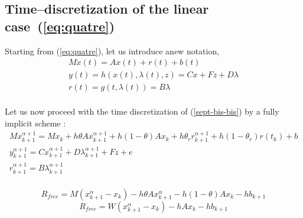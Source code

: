  

\subsection{Time--discretization of the linear case~(\ref{eq:quatre}) } 


Starting from  (\ref{eq:quatre}), let us introduce anew notation, 
\begin{equation}
\begin{array}{l}
M \dot{x}(t) = Ax(t) + r(t)  +b(t)\\[2mm]
y(t) = h(x(t),\lambda (t),z) = Cx + Fz + D \lambda  \\[2mm]
r(t) = g(t,\lambda (t) ) = B \lambda \\[2mm]
\end{array}
\label{sept-bis-bis}
\end{equation}

Let us now proceed with the time discretization of (\ref{sept-bis-bis}) by a fully implicit scheme : 
\begin{equation}
  \begin{array}{l}
    \label{eq:toto1}
     M x^{\alpha+1}_{k+1} = M x_{k} +h\theta A x^{\alpha+1}_{k+1}+h(1-\theta) A x_k + h \theta _r r^{\alpha+1}_{k+1}+ h(1-\theta _r)r(t_k)  +b\\[2mm]
     y^{\alpha+1}_{k+1} =  C x^{\alpha+1}_{k+1} + D \lambda ^{\alpha+1}_{k+1} +Fz +e\\[2mm]
     r^{\alpha+1}_{k+1} = B \lambda ^{\alpha+1}_{k+1} \\[2mm]
  \end{array}
\end{equation}

\[R_{free} = M(x^{\alpha}_{k+1} - x_{k}) -h\theta A x^{\alpha}_{k+1} - h(1-\theta) A x_k -hb_{k+1} \]
\[R_{free} = W(x^{\alpha}_{k+1} - x_{k}) -h A x_{k} -hb_{k+1} \]

